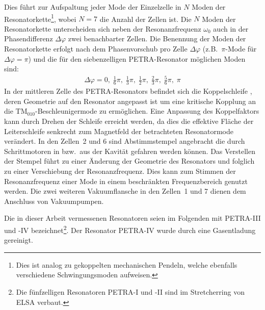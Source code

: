 Dies führt zur Aufspaltung jeder Mode der Einzelzelle in $N$ Moden der Resonatorkette\footnote{Dies ist analog zu gekoppelten mechanischen Pendeln, welche ebenfalls verschiedene Schwingungsmoden aufweisen.}, wobei $N = 7$ die Anzahl der Zellen ist.
Die $N$ Moden der Resonatorkette unterscheiden sich neben der Resonanzfrequenz $\omega_0$ auch in der Phasendifferenz $\Delta \varphi$ zwei benachbarter Zellen.
Die Benennung der Moden der Resonatorkette erfolgt nach dem Phasenvorschub pro Zelle $\Delta \varphi$ (z.B.\ $\pi$-Mode für $\Delta \varphi = \pi$) und die für den siebenzelligen PETRA-Resonator möglichen Moden sind:
\begin{align}
  \Delta \varphi = 0,\; \frac{1}{6} \pi,\; \frac{1}{3} \pi,\; \frac{1}{2} \pi,\; \frac{2}{3} \pi,\; \frac{5}{6} \pi,\; \pi
\end{align}
In der mittleren Zelle des PETRA-Resonators befindet sich die Koppelschleife \cite{desy_schleife}, deren Geometrie auf den Resonator angepasst ist um eine kritische Kopplung an die $\mathrm{TM}_{010}$-Beschleuniger\-mode zu ermöglichen.
Eine Anpassung des Koppelfaktors kann durch Drehen der Schleife erreicht werden, da dies die effektive Fläche der Leiterschleife senkrecht zum Magnetfeld der betrachteten Resonatormode verändert.
In den Zellen~2 und 6 sind Abstimmstempel \cite{desy_stempel} angebracht die durch Schrittmotoren in bzw.\ aus der Kavität gefahren werden können.
Das Verstellen der Stempel führt zu einer Änderung der Geometrie des Resonators und folglich zu einer Verschiebung der Resonanzfrequenz.
Dies kann zum Stimmen der Resonanzfrequenz einer Mode in einem beschränkten Frequenzbereich genutzt werden.
Die zwei weiteren Vakuumflansche in den Zellen~1 und 7 dienen dem Anschluss von Vakuumpumpen.


Die in dieser Arbeit vermessenen Resonatoren seien im Folgenden mit PETRA-III und -IV bezeichnet\footnote{Die fünfzelligen Resonatoren PETRA-I und -II sind im Stretcherring von ELSA verbaut.}. Der Resonator PETRA-IV wurde durch eine Gasentladung gereinigt.

